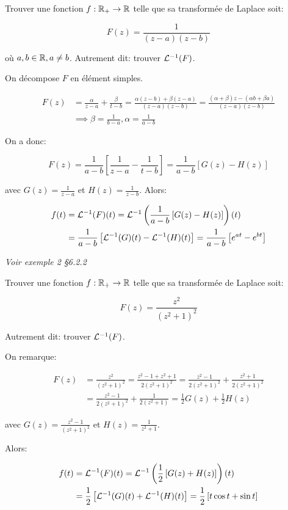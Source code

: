 \begin{example}[1]
    Trouver une fonction $f: \mathbb{R}_+ \rightarrow \mathbb{R}$ telle que sa transformée de Laplace soit:
    
    \[ F(z) = \frac{1}{(z-a)(z-b)} \]
    
    où $a, b \in \mathbb{R}, a \neq b$.
    Autrement dit: trouver $\mathcal{L}^{-1}(F)$.
    
    On décompose $F$ en élément simples.
    
    \begin{align*}
        F(z) &= \frac{\alpha}{z - a} + \frac{\beta}{t - b}
        = \frac{\alpha (z - b) + \beta (z-a)}{(z-a)(z-b)}
        = \frac{(\alpha + \beta) z - (\alpha b + \beta a)}{(z-a)(z-b)}
        \\&\implies \beta = \frac{1}{b - a}, \alpha = \frac{1}{a - b}
    \end{align*}
    
    On a donc:
    
    \[ F(z) = \frac{1}{a - b} \left[\frac{1}{z - a} - \frac{1}{t - b}\right] = \frac{1}{a - b} \left[G(z) - H(z)\right] \]
    
    avec $G(z) = \frac{1}{z - a}$ et $H(z) = \frac{1}{z - b}$.
    Alors:
    
    \begin{align*}
        f(t) &= \mathcal{L}^{-1}(F)(t)
        = \mathcal{L}^{-1}\left(\frac{1}{a - b} \left[G(z) - H(z)\right]\right)(t)
        \\&= \frac{1}{a - b} \left[ \mathcal{L}^{-1}(G)(t) - \mathcal{L}^{-1}(H)(t) \right]
        = \frac{1}{a - b} \left[ e^{at} - e^{bt} \right]
    \end{align*}
    
    \textit{Voir exemple 2 §6.2.2}
\end{example}


\begin{example}[2]
    Trouver une fonction $f: \mathbb{R}_+ \rightarrow \mathbb{R}$ telle que sa transformée de Laplace soit:
    
    \[ F(z) = \frac{z^2}{(z^2+1)^2} \]
    
    Autrement dit: trouver $\mathcal{L}^{-1}(F)$.
    
    On remarque:
    
    \begin{align*}
    F(z) &= \frac{z^2}{(z^2+1)^2}
    = \frac{z^2 - 1 + z^2 + 1}{2(z^2+1)^2}
    = \frac{z^2 - 1}{2(z^2+1)^2} + \frac{z^2 + 1}{2(z^2+1)^2}
    \\&= \frac{z^2 - 1}{2(z^2+1)^2} + \frac{1}{2(z^2+1)}
    = \frac{1}{2} G(z) + \frac{1}{2} H(z)
    \end{align*}
    
    avec $G(z) = \frac{z^2 - 1}{(z^2+1)^2}$ et $H(z) = \frac{1}{z^2+1}$.
    
    Alors:
    
    \begin{align*}
    f(t) &= \mathcal{L}^{-1}(F)(t)
    = \mathcal{L}^{-1}\left(\frac{1}{2} \left[G(z) + H(z)\right]\right)(t)
    \\&= \frac{1}{2} \left[ \mathcal{L}^{-1}(G)(t) + \mathcal{L}^{-1}(H)(t) \right]
    = \frac{1}{2} \left[ t \cos t +  \sin t \right]
    \end{align*}
\end{example}


